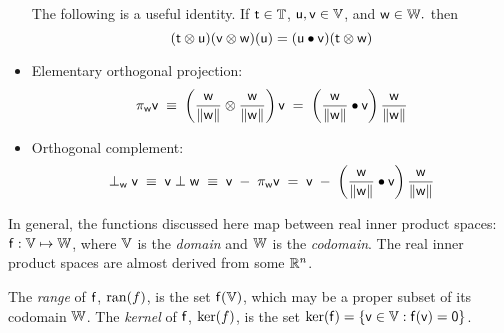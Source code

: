 \begin{itemize}
The following is a useful identity.
If $\mathsf{t} \in \mathbb{T}$, $\mathsf{u}, \mathsf{v} \in \mathbb{V}$, and $\mathsf{w} \in \mathbb{W}.$
then
\begin{equation}
\label{eq:tensor-dot}
(\mathsf{t} \otimes \mathsf{u}) (\mathsf{v} \otimes \mathsf{w})(\mathsf{u}) = (\mathsf{u} \bullet \mathsf{v}) (\mathsf{t} \otimes \mathsf{w})
\end{equation}

\item Elementary orthogonal projection:
\begin{equation}
\pi_{\mathsf{w}} \mathsf{v}
\; \equiv \;
\left( \frac{ \mathsf{w} }{ \| \mathsf{w} \| } \otimes \frac{ \mathsf{w} }{ \| \mathsf{w} \| } \right) \mathsf{v}
\; = \;
\left( \frac{\mathsf{w} }{\|\mathsf{w}\|} \bullet \mathsf{v} \right) \frac{\mathsf{w}}{\|\mathsf{w}\|}
\end{equation}

\item Orthogonal complement:
\begin{equation}
\perp_{\mathsf{w}} \mathsf{v}
\; \equiv \;
\mathsf{v} \perp \mathsf{w}
\; \equiv \;
\mathsf{v} \; - \; \pi_{\mathsf{w}} \mathsf{v}
\; = \;
\mathsf{v} \; - \; \left( \frac{\mathsf{w}}{\|\mathsf{w}\|} \bullet \mathsf{v} \right) \frac{\mathsf{w}}{\|\mathsf{w}\|}
\end{equation}

\end{itemize}

\label{sec:affine-spaces}

\label{sec:Projective-spaces}

\label{sec:Oriented-projective-spaces}
\cite{Stolfi1991opg}

\label{sec:Manifolds}

\label{sec:functions}

In general, the functions discussed here map between real inner product spaces:
$\mathsf{f}:\mathbb{V} \mapsto \mathbb{W}$, where $\mathbb{V}$ is the
\textit{domain} and $\mathbb{W}$ is the \textit{codomain}.
The real inner product spaces are almost derived from some $\mathbb{R}^n$.

The \textit{range} of $\mathsf{f}$, $\mathrm{ran}(f)$, is the set $\mathsf{f}(\mathbb{V})$,
which may be a proper subset of its codomain $\mathbb{W}$.
The \textit{kernel} of $\mathsf{f}$, $\mathrm{ker}(f)$, is the set
$\mathrm{ker}(\mathsf{f}) = \{ \mathsf{v} \in \mathbb{V} : \mathsf{f}(\mathsf{v}) = {\mathsf 0} \}$.

